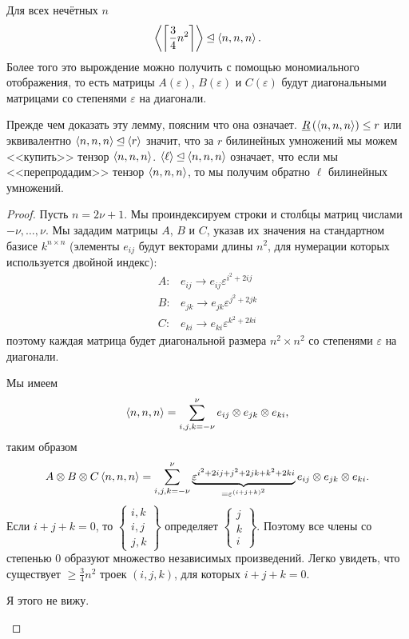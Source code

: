 \begin{lemma}\label{lem:bi:7.5} 
	Для всех нечётных $n$
	\[
		\left\langle \left\lceil \frac{3}{4} n^2 \right\rceil \right\rangle \unlhd \left\langle n, n, n \right\rangle.
	\]
	Более того это вырождение можно получить с помощью мономиального отображения, то есть матрицы $A(\varepsilon)$, $B(\varepsilon)$ и $C(\varepsilon)$ будут диагональными матрицами со степенями $\varepsilon$ на диагонали.
\end{lemma}

Прежде чем доказать эту лемму, поясним что она означает. $\underline{R}\left(\left\langle n,n,n \right\rangle\right) \leq r$ или эквивалентно $\left\langle n,n,n \right\rangle \unlhd \left\langle r \right\rangle$ значит, что за $r$ билинейных умножений мы можем <<купить>> тензор $\left\langle n,n,n \right\rangle$. $\left\langle \ell \right\rangle \unlhd \left\langle n,n,n \right\rangle$ означает, что если мы <<перепродадим>> тензор $\left\langle n,n,n \right\rangle$, то мы получим обратно $\ell$ билинейных умножений.

\begin{proof}
	Пусть $n = 2 \nu + 1$. Мы проиндексируем строки и столбцы матриц числами $-\nu, \dotsc, \nu$. Мы зададим матрицы $A$, $B$ и $C$, указав их значения на стандартном базисе $k^{n \times n}$ (элементы $e_{ij}$ будут векторами длины $n^2$, для нумерации которых используется двойной индекс):
	\[
		\begin{array}{ll}
			A: & e_{ij} \to e_{ij} \varepsilon^{i^2 + 2ij}\\
			B: & e_{jk} \to e_{jk} \varepsilon^{j^2 + 2jk}\\
			C: & e_{ki} \to e_{ki} \varepsilon^{k^2 + 2ki}  
		\end{array}
	\]
	поэтому каждая матрица будет диагональной размера $n^2 \times n^2$ со степенями $\varepsilon$ на диагонали.
	
	Мы имеем
	\[
		\left\langle n,n,n \right\rangle = \sum_{i,j,k = -\nu}^{\nu} e_{ij} \otimes e_{jk} \otimes e_{ki},
	\]
	таким образом
	\[
		A \otimes B \otimes C \left\langle n,n,n \right\rangle = \sum_{i,j,k= -\nu}^{\nu} \underbrace{\varepsilon^{i^2 + 2ij + j^2 + 2jk + k^2 + 2ki}}_{= \varepsilon^{(i+j+k)^2}} e_{ij} \otimes e_{jk} \otimes e_{ki}.
	\]
	Если $i + j + k = 0$, то $\left\{ \begin{array}{c} i,k \\ i,j \\ j,k \end{array} \right\}$ определяет $\left\{ \begin{array}{c} j\\k\\i \end{array} \right\}$. Поэтому все члены со степенью 0 образуют множество независимых произведений. Легко увидеть, что существует $\geq \frac{3}{4} n^2$ троек $(i,j,k)$, для которых $i + j + k = 0$.
	\begin{question}
		Я этого не вижу.
	\end{question}
\end{proof}

